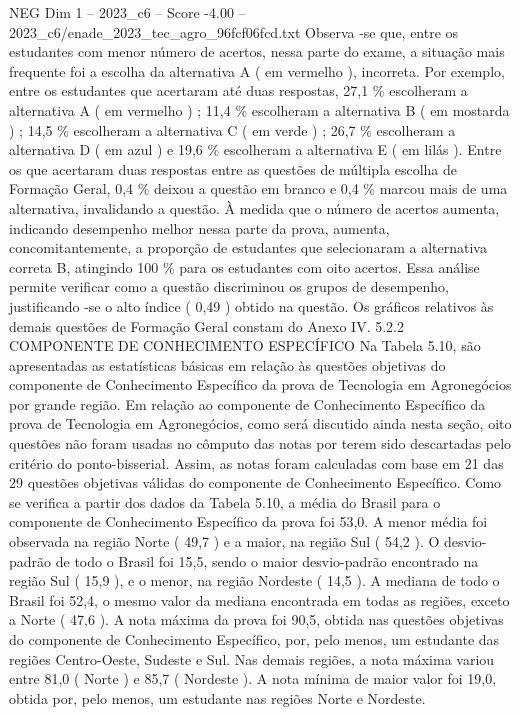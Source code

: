 \begin{textsample}{NEG Dim 1 – 2023\_c6 – Score -4.00 – 2023\_c6/enade\_2023\_tec\_agro\_96fcf06fcd.txt}
Observa -se que, entre os estudantes com menor número de acertos, nessa parte do exame, a situação mais frequente foi a escolha da alternativa A ( em vermelho ), incorreta.
Por exemplo, entre os estudantes que acertaram até duas respostas, 27,1 \% escolheram a alternativa A ( em vermelho ) ; 11,4 \% escolheram a alternativa B ( em mostarda ) ; 14,5 \% escolheram a alternativa C ( em verde ) ; 26,7 \% escolheram a alternativa D ( em azul ) e 19,6 \% escolheram a alternativa E ( em lilás ).
Entre os que acertaram duas respostas entre as questões de múltipla escolha de Formação Geral, 0,4 \% deixou a questão em branco e 0,4 \% marcou mais de uma alternativa, invalidando a questão.
À medida que o número de acertos aumenta, indicando desempenho melhor nessa parte da prova, aumenta, concomitantemente, a proporção de estudantes que selecionaram a alternativa correta B, atingindo 100 \% para os estudantes com oito acertos.
Essa análise permite verificar como a questão discriminou os grupos de desempenho, justificando -se o alto índice ( 0,49 ) obtido na questão.
Os gráficos relativos às demais questões de Formação Geral constam do Anexo IV. 5.2.2 COMPONENTE DE CONHECIMENTO ESPECÍFICO Na Tabela 5.10, são apresentadas as estatísticas básicas em relação às questões objetivas do componente de Conhecimento Específico da prova de Tecnologia em Agronegócios por grande região.
Em relação ao componente de Conhecimento Específico da prova de Tecnologia em Agronegócios, como será discutido ainda nesta seção, oito questões não foram usadas no cômputo das notas por terem sido descartadas pelo critério do ponto-bisserial.
Assim, as notas foram calculadas com base em 21 das 29 questões objetivas válidas do componente de Conhecimento Específico.
Como se verifica a partir dos dados da Tabela 5.10, a média do Brasil para o componente de Conhecimento Específico da prova foi 53,0.
A menor média foi observada na região Norte ( 49,7 ) e a maior, na região Sul ( 54,2 ).
O desvio-padrão de todo o Brasil foi 15,5, sendo o maior desvio-padrão encontrado na região Sul ( 15,9 ), e o menor, na região Nordeste ( 14,5 ).
A mediana de todo o Brasil foi 52,4, o mesmo valor da mediana encontrada em todas as regiões, exceto a Norte ( 47,6 ).
A nota máxima da prova foi 90,5, obtida nas questões objetivas do componente de Conhecimento Específico, por, pelo menos, um estudante das regiões Centro-Oeste, Sudeste e Sul.
Nas demais regiões, a nota máxima variou entre 81,0 ( Norte ) e 85,7 ( Nordeste ).
A nota mínima de maior valor foi 19,0, obtida por, pelo menos, um estudante nas regiões Norte e Nordeste.

\end{textsample}
